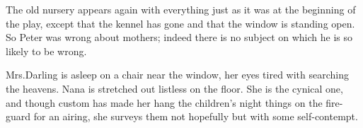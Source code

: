 

\begin{stagedir}
The old nursery appears again with everything just as it was at the beginning of the play,
except that the kennel has gone and that the window is standing open.
So Peter was wrong about mothers;
indeed there is no subject on which he is so likely to be wrong.

Mrs.\@ Darling is asleep on a chair near the window, her eyes tired with searching the heavens.
Nana is stretched out listless on the floor.
She is the cynical one,
and though custom has made her hang the children's night things on the fire-guard for an airing,
she surveys them not hopefully but with some self-contempt.
\end{stagedir}

